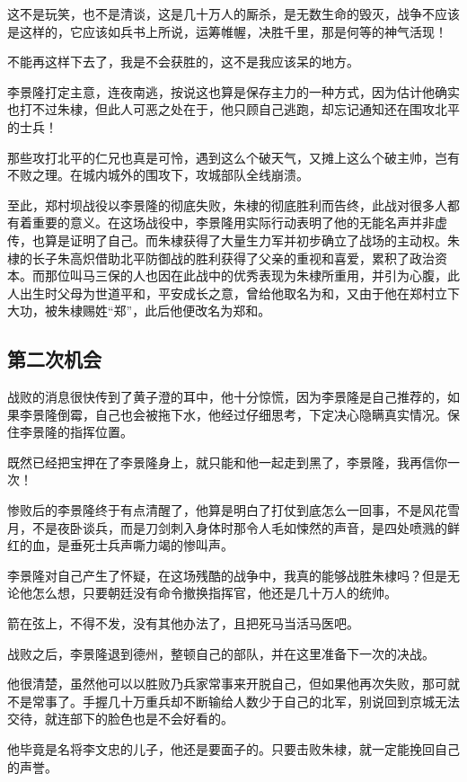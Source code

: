 \begin{multicols}{\theparacolNo}
		这不是玩笑，也不是清谈，这是几十万人的厮杀，是无数生命的毁灭，战争不应该是这样的，它应该如兵书上所说，运筹帷幄，决胜千里，那是何等的神气活现！

		不能再这样下去了，我是不会获胜的，这不是我应该呆的地方。

		李景隆打定主意，连夜南逃，按说这也算是保存主力的一种方式，因为估计他确实也打不过朱棣，但此人可恶之处在于，他只顾自己逃跑，却忘记通知还在围攻北平的士兵！

		那些攻打北平的仁兄也真是可怜，遇到这么个破天气，又摊上这么个破主帅，岂有不败之理。在城内城外的围攻下，攻城部队全线崩溃。

		至此，郑村坝战役以李景隆的彻底失败，朱棣的彻底胜利而告终，此战对很多人都有着重要的意义。在这场战役中，李景隆用实际行动表明了他的无能名声并非虚传，也算是证明了自己。而朱棣获得了大量生力军并初步确立了战场的主动权。朱棣的长子朱高炽借助北平防御战的胜利获得了父亲的重视和喜爱，累积了政治资本。而那位叫马三保的人也因在此战中的优秀表现为朱棣所重用，并引为心腹，此人出生时父母为世道平和，平安成长之意，曾给他取名为和，又由于他在郑村立下大功，被朱棣赐姓“郑”，此后他便改名为郑和。

		\subsection{第二次机会}
		战败的消息很快传到了黄子澄的耳中，他十分惊慌，因为李景隆是自己推荐的，如果李景隆倒霉，自己也会被拖下水，他经过仔细思考，下定决心隐瞒真实情况。保住李景隆的指挥位置。

		既然已经把宝押在了李景隆身上，就只能和他一起走到黑了，李景隆，我再信你一次！

		惨败后的李景隆终于有点清醒了，他算是明白了打仗到底怎么一回事，不是风花雪月，不是夜卧谈兵，而是刀剑刺入身体时那令人毛如悚然的声音，是四处喷溅的鲜红的血，是垂死士兵声嘶力竭的惨叫声。

		李景隆对自己产生了怀疑，在这场残酷的战争中，我真的能够战胜朱棣吗？但是无论他怎么想，只要朝廷没有命令撤换指挥官，他还是几十万人的统帅。

		箭在弦上，不得不发，没有其他办法了，且把死马当活马医吧。

		战败之后，李景隆退到德州，整顿自己的部队，并在这里准备下一次的决战。

		他很清楚，虽然他可以以胜败乃兵家常事来开脱自己，但如果他再次失败，那可就不是常事了。手握几十万重兵却不断输给人数少于自己的北军，别说回到京城无法交待，就连部下的脸色也是不会好看的。

		他毕竟是名将李文忠的儿子，他还是要面子的。只要击败朱棣，就一定能挽回自己的声誉。


\end{multicols}

